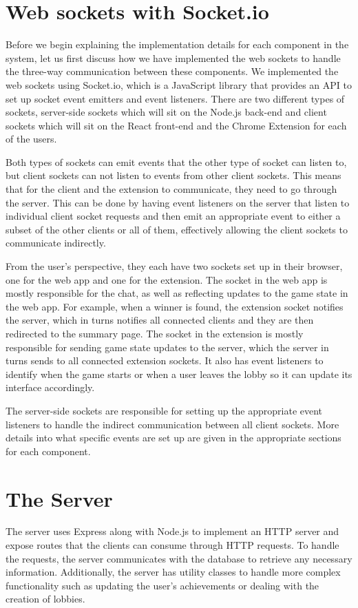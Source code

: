 \documentclass{l4proj}
\begin{document}
\section{Web sockets with Socket.io}
Before we begin explaining the implementation details for each component in the system, let us first discuss how we have implemented the web sockets to handle the three-way communication between these components. We implemented the web sockets using Socket.io, which is a JavaScript library that provides an API to set up socket event emitters and event listeners. There are two different types of sockets, server-side sockets which will sit on the Node.js back-end and client sockets which will sit on the React front-end and the Chrome Extension for each of the users. 

Both types of sockets can emit events that the other type of socket can listen to, but client sockets can not listen to events from other client sockets. This means that for the client and the extension to communicate, they need to go through the server. This can be done by having event listeners on the server that listen to individual client socket requests and then emit an appropriate event to either a subset of the other clients or all of them, effectively allowing the client sockets to communicate indirectly.

From the user's perspective, they each have two sockets set up in their browser, one for the web app and one for the extension. The socket in the web app is mostly responsible for the chat, as well as reflecting updates to the game state in the web app. For example, when a winner is found, the extension socket notifies the server, which in turns notifies all connected clients and they are then redirected to the summary page. The socket in the extension is mostly responsible for sending game state updates to the server, which the server in turns sends to all connected extension sockets. It also has event listeners to identify when the game starts or when a user leaves the lobby so it can update its interface accordingly.

The server-side sockets are responsible for setting up the appropriate event listeners to handle the indirect communication between all client sockets. More details into what specific events are set up are given in the appropriate sections for each component.

\section{The Server}
The server uses Express along with Node.js to implement an HTTP server and expose routes that the clients can consume through HTTP requests. To handle the requests, the server communicates with the database to retrieve any necessary information. Additionally, the server has utility classes to handle more complex functionality such as updating the user's achievements or dealing with the creation of lobbies. 
\end{document}
